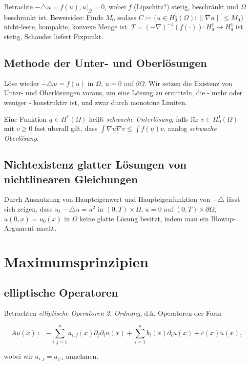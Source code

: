 \documentclass[11pt,a4paper]{scrartcl}
\newcommand{\laplace}{\triangle}
\theoremstyle{plain}
\theoremstyle{definition}
\theoremstyle{remark}
\begin{document}
Betrachte $-\laplace u = f(u), u|_\Omega = 0$, wobei $f$ (Lipschitz?) stetig, beschränkt und $\Omega$ beschränkt ist. Beweisidee: Finde $M_0$ sodass $C\coloneqq \{ u\in H^1_0(\Omega): \|\nabla u\| \leq M_0\}$ nicht-leere, kompakte, konvexe Menge ist. $T = (-\nabla)^{-1}(f(\cdot)): H^1_0\to H^1_0$ ist stetig, Schauder liefert Fixpunkt.

\subsection{Methode der Unter- und Oberlösungen}

Löse wieder $-\laplace u = f(u)$ in $\Omega$, $u=0$ auf $\partial\Omega$. Wir setzen die Existenz von Unter- und Oberlösungen voraus, um eine Lösung zu ermitteln, die - mehr oder weniger - konstruktiv ist, und zwar durch monotone Limiten.

Eine Funktion $\underline{u}\in H^1(\Omega)$ heißt \emph{schwache Unterlösung}, falls für $v\in H^1_0(\Omega)$ mit $v\geq 0$ fast überall gilt, dass $\int \nabla \underline{u} \nabla v \leq \int f(\underline{u})v$, analog \emph{schwache Oberlösung}.

\subsection{Nichtexistenz glatter Lösungen von nichtlinearen Gleichungen}

Durch Ausnutzung von Haupteigenwert und Haupteigenfunktion von $-\laplace$ lässt sich zeigen, dass $u_t -\laplace u = u^2$ in $(0,T)\times \Omega$, $u=0$ auf $(0,T)\times \partial\Omega$, $u(0,x)=u_0(x)$ in $\Omega$ keine glatte Lösung besitzt, indem man ein Blowup-Argument macht.

\section{Maximumsprinzipien}

\subsection{elliptische Operatoren}

Betrachten \emph{elliptische Operatoren 2. Ordnung}, d.h. Operatoren der Form

$$Au(x)\coloneqq -\sum_{i,j=1}^n a_{i,j}(x)\partial_j \partial_i u(x) + \sum_{i=1}^n b_i(x) \partial_i u(x) +c(x) u(x),$$

wobei wir $a_{i,j}=a_{j,i}$ annehmen.
\end{document}
